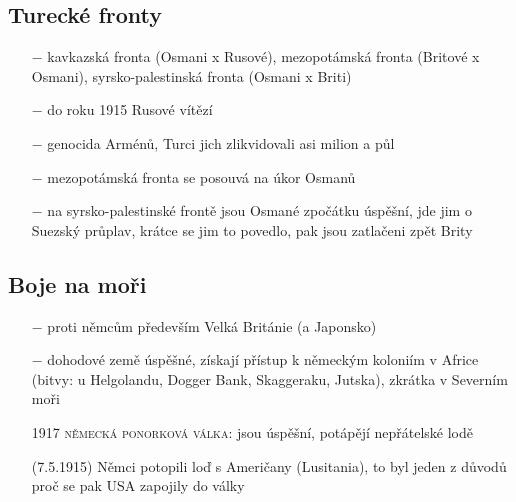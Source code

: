 \documentclass{article}
\begin{document}
\subsection*{Turecké fronty}
\begin{itemize}
    \vspace{-0.5em}
    \setlength\itemsep{0.15em}
    \item[$-$] kavkazská fronta (Osmani x Rusové), mezopotámská fronta (Britové x Osmani), syrsko-palestinská fronta (Osmani x Briti)
    \item[$-$] do roku 1915 Rusové vítězí
    \item[$-$] genocida Arménů, Turci jich zlikvidovali asi milion a půl
    \item[$-$] mezopotámská fronta se posouvá na úkor Osmanů
    \item[$-$] na syrsko-palestinské frontě jsou Osmané zpočátku úspěšní, jde jim o Suezský průplav, krátce se jim to povedlo, pak jsou zatlačeni zpět Brity
\end{itemize}

\subsection*{Boje na moři}
\begin{itemize}
    \vspace{-0.5em}
    \setlength\itemsep{0.15em}
    \item[$-$] proti němcům především Velká Británie (a Japonsko)
    \item[$-$] dohodové země úspěšné, získají přístup k německým koloniím v Africe (bitvy: u Helgolandu, Dogger Bank, Skaggeraku, Jutska), zkrátka v Severním moři
    \item[1917] \textsc{německá ponorková válka}: jsou úspěšní, potápějí nepřátelské lodě
    \item[(7.5.1915)] Němci potopili loď s Američany (Lusitania), to byl jeden z důvodů proč se pak USA zapojily do války
\end{itemize}
\end{document}
